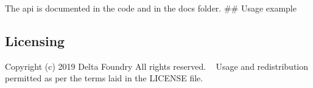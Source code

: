 The api is documented in the code and in the docs folder. \#\# Usage example 
\begin{DoxyCode}{0}
\DoxyCodeLine{\textcolor{preprocessor}{\#include <utfc.h>}}
\DoxyCodeLine{    }
\DoxyCodeLine{\}}
\end{DoxyCode}
 \subsection*{Licensing}

Copyright (c) 2019 Delta Foundry All rights reserved. ~\newline
Usage and redistribution permitted as per the terms laid in the L\+I\+C\+E\+N\+SE file. 